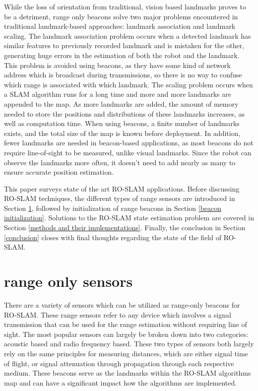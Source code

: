 \documentclass[conference]{IEEEtran}
\begin{document}
		While the loss of orientation from traditional, vision based landmarks  proves to be a detriment, range only beacons solve two major problems encountered in traditional landmark-based approaches: landmark association and landmark scaling. The landmark association problem occurs when a detected landmark has similar features to previously recorded landmark and is mistaken for the other, generating huge errors in the estimation of both the robot and the landmark. This problem is avoided using beacons, as they have some kind of network address which is broadcast during transmissions, so there is no way to confuse which range is associated with which landmark. The scaling problem occurs when a SLAM algorithm runs for a long time and more and more landmarks are appended to the map. As more landmarks are added, the amount of memory needed to store the positions and distributions of these landmarks increases, as well as computation time. When using beacons, a finite number of landmarks exists, and the total size of the map is known before deployment. In addition, fewer landmarks are needed in beacon-based applications, as most beacons do not require line-of-sight to be measured, unlike visual landmarks. Since the robot can observe the landmarks more often, it doesn't need to add nearly as many to ensure accurate position estimation. %
		
		This paper surveys state of the art RO-SLAM applications. Before discussing RO-SLAM techniques, the different types of range sensors are introduced in Section \ref{range only sensors}, followed by initialization of range beacons in Section \ref{beacon initialization}. Solutions to the RO-SLAM state estimation problem are covered in Section \ref{methods and their implementations}. Finally, the conclusion in Section \ref{conclusion} closes with final thoughts regarding the state of the field of RO-SLAM.
	
	
	\section{range only sensors}
	\label{range only sensors}
		There are a variety of sensors which can be utilized as range-only beacons for RO-SLAM. These range sensors refer to any device which involves a signal transmission that can be used for the range estimation without requiring line of sight. The most popular sensors can largely be broken down into two categories: acoustic based and radio frequency based. These two types of sensors both largely rely on the same principles for measuring distances, which are either signal time of flight, or signal attenuation through propagation through each respective medium. These beacons serve as the landmarks within the RO-SLAM algorithms map and can have a significant impact how the algorithms are implemented.
	
\end{document}

